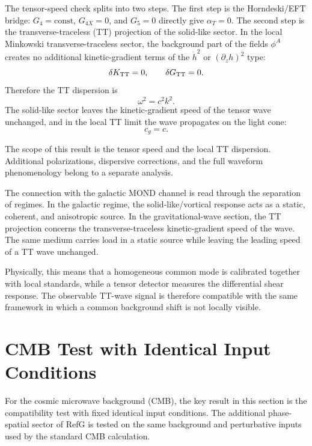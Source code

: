 \documentclass[12pt]{article}
\begin{document}
The tensor-speed check splits into two steps. The first step is the Horndeski/EFT bridge: $G_4=\mathrm{const}$, $G_{4X}=0$, and $G_5=0$ directly give $\alpha_T=0$. The second step is the transverse-traceless (TT) projection of the solid-like sector. In the local Minkowski transverse-traceless sector, the background part of the fields $\phi^A$ creates no additional kinetic-gradient terms of the $\dot h^2$ or $(\partial_z h)^2$ type:
\begin{equation}
\delta K_{\rm TT}=0,\qquad \delta G_{\rm TT}=0 .
\end{equation}
Therefore the TT dispersion is
\begin{equation}
\omega^2=c^2k^2 .
\end{equation}
The solid-like sector leaves the kinetic-gradient speed of the tensor wave unchanged, and in the local TT limit the wave propagates on the light cone:
\begin{equation}
c_g=c .
\end{equation}

The scope of this result is the tensor speed and the local TT dispersion. Additional polarizations, dispersive corrections, and the full waveform phenomenology belong to a separate analysis.

The connection with the galactic MOND channel is read through the separation of regimes. In the galactic regime, the solid-like/vortical response acts as a static, coherent, and anisotropic source. In the gravitational-wave section, the TT projection concerns the transverse-traceless kinetic-gradient speed of the wave. The same medium carries load in a static source while leaving the leading speed of a TT wave unchanged.

Physically, this means that a homogeneous common mode is calibrated together with local standards, while a tensor detector measures the differential shear response. The observable TT-wave signal is therefore compatible with the same framework in which a common background shift is not locally visible.

\section{CMB Test with Identical Input Conditions}

For the cosmic microwave background (CMB), the key result in this section is the compatibility test with fixed identical input conditions. The additional phase-spatial sector of RefG is tested on the same background and perturbative inputs used by the standard CMB calculation.
\end{document}
